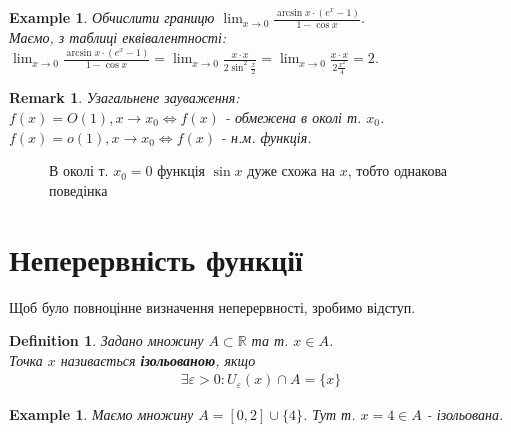 \documentclass[a4paper, 14pt]{article}
\def\huge{\displaystyle}
\theoremstyle{theoremdd}
\theoremstyle{theoremdd}
\newtheorem{definition}[theorem]{Definition}
\theoremstyle{theoremdd}
\theoremstyle{theoremdd}
\newtheorem{example}[theorem]{Example}
\theoremstyle{theoremdd}
\theoremstyle{theoremdd}
\newtheorem{remark}[theorem]{Remark}
\theoremstyle{theoremdd}
\theoremstyle{theoremdd}
\begin{document}
\begin{example}
Обчислити границю $\huge \lim_{x \to 0} \frac{\arcsin x \cdot (e^x - 1)}{1 - \cos x}$.\\
Маємо, з таблиці еквівалентності:\\
$\huge \lim_{x \to 0} \frac{\arcsin x \cdot (e^x - 1)}{1 - \cos x} = \lim_{x \to 0} \frac{x \cdot x}{2 \sin^2 \frac{x}{2}} = \lim_{x \to 0} \frac{x \cdot x}{2 \frac{x^2}{4}} = 2$.
\end{example}

\begin{remark}
Узагальнене зауваження:\\
$f(x) = O(1), x \to x_0 \iff f(x)$ - обмежена в околі т. $x_0$.\\
$f(x) = o(1), x \to x_0 \iff f(x)$ - н.м. функція.
\end{remark}
\begin{figure} [H]
\centering
{}
\caption*{В околі т. $x_0 = 0$ функція $\sin x$ дуже схожа на $x$, тобто однакова поведінка}
\end{figure}
\newpage

\section{Неперервність функції}
Щоб було повноцінне визначення неперервності, зробимо відступ.
\begin{definition}
Задано множину $A \subset \mathbb{R}$ та т. $x \in A$.\\
Точка $x$ називається \textbf{ізольованою}, якщо
\begin{align*}
\exists \varepsilon > 0: U_{\varepsilon}(x) \cap A = \{x\}
\end{align*}
\end{definition}

\begin{example}
Маємо множину $A = [0,2] \cup \{4\}$. Тут т. $x = 4 \in A$ - ізольована.
\end{example}
\end{document}
